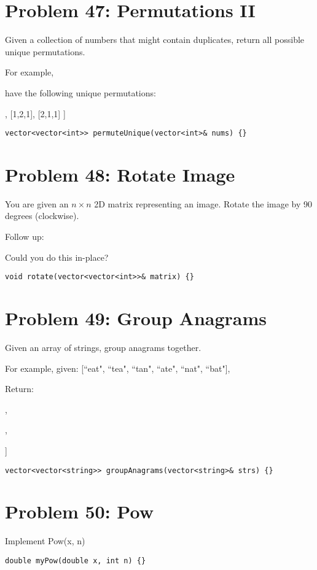 \documentclass[12pt,a4paper]{article}
\begin{document}
\section*{Problem 47: Permutations II}
Given a collection of numbers that might contain duplicates, return all possible unique permutations.
\par
For example,
\par
[1,1,2] have the following unique permutations:
\par
[
[1,1,2],
[1,2,1],
[2,1,1]
]
\begin{lstlisting}
vector<vector<int>> permuteUnique(vector<int>& nums) {}
\end{lstlisting}

\section*{Problem 48: Rotate Image}
You are given an $n \times n$ 2D matrix representing an image. Rotate the image by 90 degrees (clockwise).
\par
Follow up:
\par
Could you do this in-place?
\begin{lstlisting}
void rotate(vector<vector<int>>& matrix) {}
\end{lstlisting}

\section*{Problem 49: Group Anagrams}
Given an array of strings, group anagrams together.
\par
For example, given: [``eat", ``tea", ``tan", ``ate", ``nat", ``bat"], 
\par
Return:
\par
[
\par
[``ate", ``eat",``tea"],
\par
[``nat",``tan"],
\par
[``bat"]
\par
]
\begin{lstlisting}
vector<vector<string>> groupAnagrams(vector<string>& strs) {}
\end{lstlisting}

\section*{Problem 50: Pow}
Implement Pow(x, n)

\begin{lstlisting}
double myPow(double x, int n) {}
\end{lstlisting}
\end{document}
